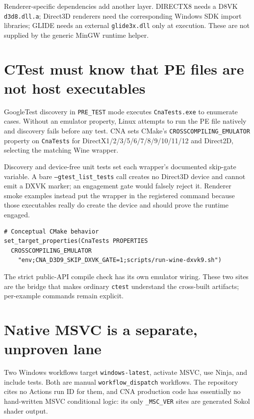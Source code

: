 Renderer-specific dependencies add another layer. DIRECTX8 needs a D8VK
\texttt{d3d8.dll.a}; Direct3D renderers need the corresponding Windows SDK import libraries;
GLIDE needs an external \texttt{glide3x.dll} only at execution. These are not supplied by the
generic MinGW runtime helper.

\section{CTest must know that PE files are not host executables}

GoogleTest discovery in \texttt{PRE\_TEST} mode executes \texttt{CnaTests.exe} to enumerate
cases. Without an emulator property, Linux attempts to run the PE file natively and discovery
fails before any test. CNA sets CMake's \texttt{CROSSCOMPILING\_EMULATOR} property on
\texttt{CnaTests} for DirectX1/2/3/5/6/7/8/9/10/11/12 and Direct2D, selecting the matching Wine
wrapper.

Discovery and device-free unit tests set each wrapper's documented skip-gate variable. A bare
\texttt{--gtest\_list\_tests} call creates no Direct3D device and cannot emit a DXVK marker; an
engagement gate would falsely reject it. Renderer smoke examples instead put the wrapper in the
registered command because those executables really do create the device and should prove the
runtime engaged.

\begin{lstlisting}
# Conceptual CMake behavior
set_target_properties(CnaTests PROPERTIES
  CROSSCOMPILING_EMULATOR
    "env;CNA_D3D9_SKIP_DXVK_GATE=1;scripts/run-wine-dxvk9.sh")
\end{lstlisting}

The strict public-API compile check has its own emulator wiring. These two sites are the bridge
that makes ordinary \texttt{ctest} understand the cross-built artifacts; per-example commands
remain explicit.

\section{Native MSVC is a separate, unproven lane}

Two Windows workflows target \texttt{windows-latest}, activate MSVC, use Ninja, and include
tests. Both are manual \texttt{workflow\_dispatch} workflows. The repository cites no Actions
run ID for them, and CNA production code has essentially no hand-written MSVC conditional
logic: its only \texttt{\_MSC\_VER} sites are generated Sokol shader output.

